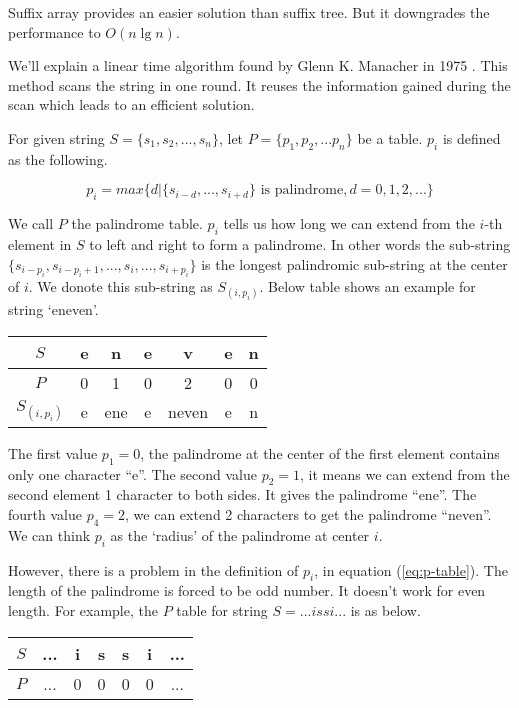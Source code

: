 \documentclass[b5paper]{article}
\begin{document}
Suffix array provides an easier solution than suffix tree. But it downgrades
the performance to $O(n \lg n)$.

We'll explain a linear time algorithm found by Glenn K. Manacher in 1975 \cite{Manacher75}.
This method scans the string in one round. It reuses the information gained during the scan
which leads to an efficient solution.

For given string $S = \{s_1, s_2, ..., s_n\}$, let $P = \{p_1, p_2, ... p_n\}$ be a table.
$p_i$ is defined as the following.

\begin{equation}
p_i = max \{ d | \{s_{i-d}, ..., s_{i+d}\} \textrm{\ is palindrome}, d = 0, 1, 2, ...\}
\label{eq:p-table}
\end{equation}

We call $P$ the palindrome table.
$p_i$ tells us how long we can extend from the $i$-th element in $S$ to
left and right to form a palindrome. In other words the sub-string
$\{s_{i-p_i}, s_{i-p_i+1}, ..., s_i, ..., s_{i+p_i}\}$ is the longest palindromic sub-string
at the center of $i$. We donote this sub-string as $S_{(i, p_i)}$.
Below table shows an example for string `eneven'.

\begin{tabular}{|c|c|c|c|c|c|c|}
\hline
$S$ & e & n & e & v & e & n \\
\hline
$P$ & 0 & 1 & 0 & 2 & 0 & 0 \\
\hline
$S_{(i, p_i)}$ & e & ene & e & neven & e & n \\
\hline
\end{tabular}

The first value $p_1 = 0$, the palindrome at the center of the first element contains
only one character ``e''. The second value $p_2 = 1$, it means we can extend from
the second element 1 character to both sides. It gives the
palindrome ``ene''. The fourth value $p_4 = 2$, we can extend 2 characters to get
the palindrome ``neven''. We can think
$p_i$ as the `radius' of the palindrome at center $i$.

However, there is a problem in the definition of $p_i$, in equation (\cref{eq:p-table}).
The length of the palindrome is forced to be odd number. It doesn't work
for even length. For example, the $P$ table for string $S = ...issi...$ is as below.

\begin{tabular}{|c|c|c|c|c|c|c|}
\hline
$S$ & ... & i & s & s & i & ... \\
\hline
$P$ & ... & 0 & 0 & 0 & 0 & ... \\
\hline
\end{tabular}
\end{document}
